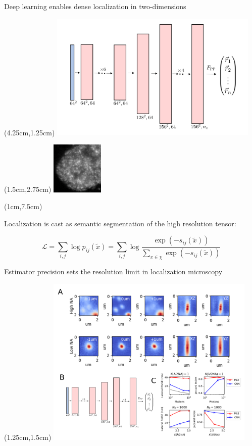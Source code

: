 \documentclass{beamer}					%
\begin{document}
\begin{frame}{Deep learning enables dense localization in two-dimensions}
\begin{textblock*}{10cm}(4.25cm,1.25cm)
\includegraphics[width=10cm]{DeepSTORM.png}
\end{textblock*}
\begin{textblock*}{2.5cm}(1.5cm,2.75cm)
\includegraphics[width=2.5cm]{Laser-Crop.png}
\end{textblock*}

\begin{textblock*}{\textwidth}(1cm,7.5cm)

Localization is cast as semantic segmentation of the high resolution tensor:

\begin{equation*}
\mathcal{L} = \sum_{i,j} \log p_{ij}(\tilde{x}) = \sum_{i,j} \log \frac{\exp(-s_{ij}(\tilde{x}))}{\sum_{x\in\chi} \exp(-s_{ij}(\tilde{x}))}
\end{equation*}

\end{textblock*}

\end{frame}


\begin{frame}{Estimator precision sets the resolution limit in localization microscopy}

\begin{textblock*}{18cm}(1.25cm,1.5cm)
\includegraphics[width=10cm]{PSF2D.png}
\end{textblock*}

\end{frame}
\end{document}
